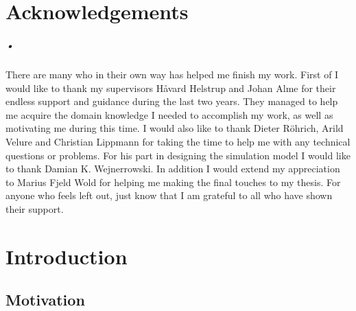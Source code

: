 \documentclass[a4paper, 12pt, openright, twoside]{report}
\begin{document}
\newpage

\chapter*{Acknowledgements}

\paragraph{•}
There are many who in their own way has helped me finish my work.
First of I would like to thank my supervisors H\r{a}vard Helstrup and Johan Alme for their endless support and guidance during the last two years.
They managed to help me acquire the domain knowledge I needed to accomplish my work, as well as motivating me during this time.
I would also like to thank Dieter R\"{o}hrich, Arild Velure and Christian Lippmann for taking the time to help me with any technical questions or problems.
For his part in designing the simulation model I would like to thank Damian K. Wejnerrowski.
In addition I would extend my appreciation to Marius Fjeld Wold for helping me making the final touches to my thesis.
For anyone who feels left out, just know that I am grateful to all who have shown their support.

{}
\tableofcontents

\newpage
{}
{}
\listoffigures

\newpage
{}
{}
\listoftables

\newpage
{}
{}
\lstlistoflistings
\newpage

\printglossary[type=\acronymtype,title={Terms and Abbreviations}]
\newpage
\pagestyle{fancy}
\chapter{Introduction}

\section{Motivation}
\label{sec:motivation}
\end{document}
